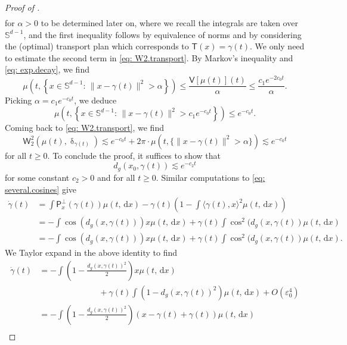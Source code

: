 \documentclass[a4paper,11pt]{article}
\theoremstyle{plain}
\newcommand{\proj}{\bm{\mathsf{P}}^\perp}
\newcommand{\diff}{\, \mathrm{d}}
\renewcommand{\S}{\mathbb{S}^{d-1}}
\renewcommand{\leq}{\leqslant}
\renewcommand{\geq}{\geqslant}
\numberwithin{equation}{section}
\begin{document}
\begin{proof}[Proof of ]
\begin{align}
\end{align}
for $\alpha>0$ to be determined later on, where we recall the integrals are taken over $\S$, and the first inequality follows by equivalence of norms and by considering the (optimal) transport plan which corresponds to $\mathsf{T}(x)=\gamma(t)$.
We only need to estimate the second term in \eqref{eq: W2.transport}. 
By Markov's inequality and \eqref{eq: exp.decay}, we find
\begin{equation*}
    \mu\left(t,\left\{x\in \S:\, \|x-\gamma(t)\|^2>\alpha\right\}\right)\leq \frac{\mathsf{V}[\mu(t)](t)}{\alpha}\leq \frac{c_1e^{-2c_0 t}}{\alpha}.
\end{equation*}
Picking $\alpha=c_1e^{-c_0t}$, we deduce
\begin{equation*}
   \mu\left(t,\left\{x\in \S:\, \|x-\gamma(t)\|^2> c_1e^{-c_0t}\right\}\right)\leq e^{-c_0t}.
\end{equation*}
Coming back to \eqref{eq: W2.transport}, we find
\begin{equation*} 
   \mathsf{W}_2^2\left(\mu(t),\updelta_{\gamma(t)}\right)
   \lesssim e^{-c_0 t} +  2\pi\cdot\mu\left(t,\{\|x-\gamma(t)\|^2>\alpha\}\right)\lesssim e^{-c_0 t}
\end{equation*}
for all $t\geq 0$.
To conclude the proof, it suffices to show that
\begin{equation*}
    d_g(x_0,\gamma(t))\lesssim e^{-c_2 t}
\end{equation*}
for some constant $c_2>0$ and for all $t\geq 0$.
Similar computations to \eqref{eq: several.cosines} give
\begin{align*}
    \dot{\gamma}(t)&=\int \proj_x(\gamma(t))\mu(t,\diff x)-\gamma(t) \left(1-\int \langle \gamma(t),x\rangle^2\mu(t,\diff x)\right)\\
    &=-\int \cos(d_g(x,\gamma(t)))x\mu(t,\diff x)+\gamma(t)\int \cos^2(d_g(x,\gamma(t))\mu(t,\diff x)\\
    &=-\int \cos(d_g(x,\gamma(t)))x\mu(t,\diff x)+\gamma(t)\int \cos^2(d_g(x,\gamma(t))\mu(t,\diff x).
\end{align*}
We Taylor expand in the above identity to find
\begin{align*}
    \dot{\gamma}(t)&=-\int\left(1-\frac{d_g(x,\gamma(t))^2}{2}\right)x\mu(t,\diff x)\nonumber\\
    &\hspace{3cm}+\gamma(t)\int (1-d_g(x,\gamma(t))^2)\mu(t,\diff x)+O\left(\varepsilon_0^4\right)\nonumber\\
    &=-\int\left(1-\frac{d_g(x,\gamma(t))^2}{2}\right)(x-\gamma(t)+\gamma(t))\mu(t,\diff x)\nonumber\\

\end{align*}
\end{proof}
\end{document}
